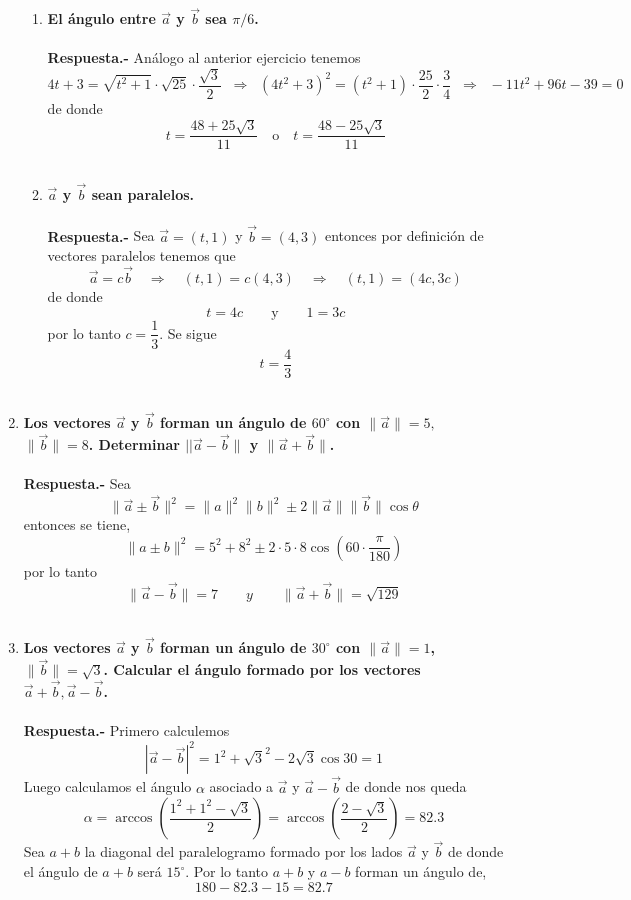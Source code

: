 \begin{enumerate}
\begin{enumerate}[\bfseries a)]
    \item \textbf{\boldmath El ángulo entre $\vec{a}$ y $\vec{b}$ sea $\pi/6$.\\\\
	Respuesta.-}\; Análogo al anterior ejercicio tenemos $$4t+3=\sqrt{t^2+1}\cdot \sqrt{25}\cdot \dfrac{\sqrt{3}}{2}\;\; \Longrightarrow \; \; (4t^2+3)^2=(t^2+1)\cdot\dfrac{25}{2}\cdot \dfrac{3}{4}\;\; \Longrightarrow \; \; -11t^2+96t-39=0$$
	de donde $$t=\dfrac{48+25\sqrt{3}}{11} \quad \mbox{o} \quad t=\dfrac{48-25\sqrt{3}}{11}$$\\

    \item \textbf{\boldmath $\vec{a}$ y $\vec{b}$ sean paralelos.\\\\
	Respuesta.-}\; Sea $\vec{a}=(t,1)$ y $\vec{b}=(4,3)$ entonces por definición de vectores paralelos tenemos que $$\vec{a}=c\vec{b} \quad \Longrightarrow \quad (t,1)=c(4,3) \quad \Longrightarrow \quad (t,1)=(4c,3c)$$
	de donde $$t=4c \qquad \mbox{y} \qquad 1=3c$$
	por lo tanto $c=\dfrac{1}{3}$. Se sigue $$t=\dfrac{4}{3}$$\\

\end{enumerate}

\item \textbf{\boldmath Los vectores $\vec{a}$ y $\vec{b}$ forman un ángulo de $60^\circ$ con $\|\vec{a}\|=5,$ $\|\vec{b}\|=8$. Determinar $||\vec{a}-\vec{b}\|$ y $\|\vec{a}+\vec{b}\|$.\\\\
    Respuesta.-}\; Sea $$\| \vec{a}\pm\vec{b}\|^2=\|a\|^2\|b\|^2 \pm 2\|\vec{a}\|\|\vec{b}\|\cos \theta$$  
    entonces se tiene, $$\|a\pm b\|^2 = 5^2 + 8^2 \pm 2\cdot 5\cdot 8 \cos\left(60\cdot\dfrac{\pi}{180}\right)$$
    por lo tanto $$\|\vec{a}-\vec{b}\| = 7 \qquad y \qquad \|\vec{a}+\vec{b}\| = \sqrt{129}$$\\

\item \textbf{\boldmath Los vectores $\vec{a}$ y $\vec{b}$ forman un ángulo de $30^\circ$ con $\|\vec{a}\|=1$, $\|\vec{b}\|=\sqrt{3}$. Calcular el ángulo formado por los vectores $\vec{a}+\vec{b}, \vec{a}-\vec{b}$.\\\\
    Respuesta.-}\; Primero calculemos $$|\vec{a}-\vec{b}|^2 = 1^2 + \sqrt{3}^2 - 2\sqrt{3} \cos 30 = 1$$
    Luego calculamos el ángulo $\alpha$ asociado a $\vec{a}$ y $\vec{a}-\vec{b}$ de donde nos queda $$\alpha= \arccos \left(\dfrac{1^2+1^2-\sqrt{3}}{2}\right) = \arccos\left(\dfrac{2-\sqrt{3}}{2}\right) = 82\mbox{.}3$$
    Sea  $a+b$ la diagonal del paralelogramo formado por los lados $\vec{a}$ y $\vec{b}$ de donde el ángulo de $a+b$ será $15^\circ$. Por lo tanto  $a+b$ y  $a-b$ forman un ángulo de, $$180-82\mbox{.}3-15=82\mbox{.}7$$\\


\end{enumerate}

